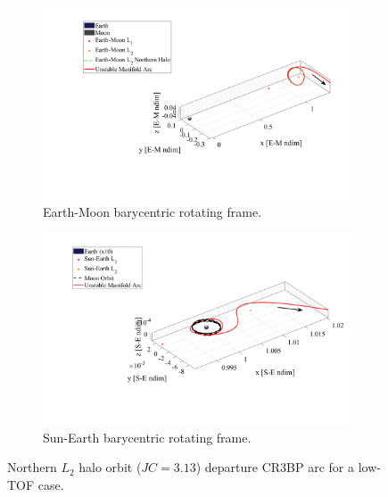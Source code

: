 \begin{figure}[!htb]
    \begin{subfigure}[h]{0.495\linewidth}
        \includegraphics[width=\textwidth]{figures/DirectMinTOFEM.pdf}
        \caption{Earth-Moon barycentric rotating frame.}
    \end{subfigure}
    \hfill
    \begin{subfigure}[h]{0.495\linewidth}
        \includegraphics[width=\textwidth]{figures/DirectMinTOFSE.pdf}
        \caption{Sun-Earth barycentric rotating frame.}
    \end{subfigure}
    \caption{Northern $L_{2}$ halo orbit ($JC=3.13$) departure CR3BP arc for a low-TOF case.}
    \label{fig:directMinTOFE}
\end{figure}

